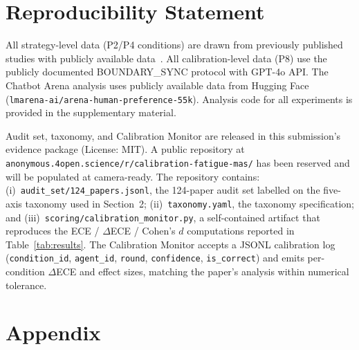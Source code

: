 \documentclass[11pt]{article}
\begin{document}
\section*{Reproducibility Statement}

All strategy-level data (P2/P4 conditions) are drawn from previously published studies with publicly available data~\cite{mmepc2026}. All calibration-level data (P8) use the publicly documented BOUNDARY\_SYNC protocol with GPT-4o API. The Chatbot Arena analysis uses publicly available data from Hugging Face (\texttt{lmarena-ai/arena-human-preference-55k}). Analysis code for all experiments is provided in the supplementary material.

Audit set, taxonomy, and Calibration Monitor are released in this submission's evidence package (License: MIT). A public repository at \texttt{anonymous.4open.science/r/calibration-fatigue-mas/} has been reserved and will be populated at camera-ready.
The repository contains: (i)~\texttt{audit\_set/124\_papers.jsonl}, the
124-paper audit set labelled on the five-axis taxonomy used in
Section~2; (ii)~\texttt{taxonomy.yaml}, the taxonomy specification;
and (iii)~\texttt{scoring/calibration\_monitor.py}, a self-contained artifact
that reproduces the ECE / $\Delta$ECE / Cohen's $d$ computations reported in
Table~\ref{tab:results}. The Calibration Monitor accepts a JSONL
calibration log (\texttt{condition\_id}, \texttt{agent\_id}, \texttt{round},
\texttt{confidence}, \texttt{is\_correct}) and emits per-condition
$\Delta$ECE and effect sizes, matching the paper's analysis within numerical
tolerance.




\appendix
\section{Appendix}
\end{document}
